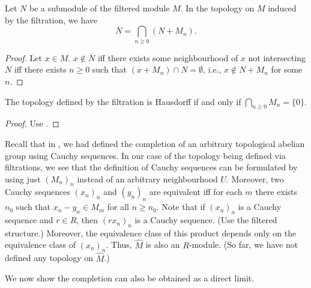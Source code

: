 \begin{prop}
	Let $N$ be a submodule of the filtered module $M$. In the topology on $M$ induced by the filtration, we have
	\begin{equation*} 
		\overline{N} = \bigcap_{n \ge 0} (N + M_{n}).
	\end{equation*}
\end{prop}
\begin{proof} 
	Let $x \in M$. $x \notin \overline{N}$ iff there exists some neighbourhood of $x$ not intersecting $N$ iff there exists $n \ge 0$ such that $(x + M_{n}) \cap N = \emptyset$, i.e., $x \notin N + M_{n}$ for some $n$.
\end{proof}

\begin{cor} \label{cor:filtration-hausdorff-intersection-zero}
	The topology defined by the filtration is Hausdorff if and only if $\bigcap_{n \ge 0} M_{n} = \{0\}$.
\end{cor}
\begin{proof} 
	Use .
\end{proof}

Recall that in , we had defined the completion of an arbitrary topological abelian group using Cauchy sequences. In our case of the topology being defined via filtrations, we see that the definition of Cauchy sequences can be formulated by using just $(M_{n})_{n}$ instead of an arbitrary neighbourhood $U$. Moreover, two Cauchy sequences $(x_{n})_{n}$ and $(y_{n})_{n}$ are equivalent iff for each $m$ there exists $n_{0}$ such that $x_{n} - y_{n} \in M_{m}$ for all $n \ge n_{0}$. \newline
Note that if $(x_{n})_{n}$ is a Cauchy sequence and $r \in R$, then $(r x_{n})_{n}$ is a Cauchy sequence. (Use the filtered structure.) \newline
Moreover, the equivalence class of this product depends only on the equivalence class of $(x_{n})_{n}$. Thus, $\widehat{M}$ is also an $R$-module. (So far, we have not defined any topology on $\widehat{M}$.)

We now show the completion can also be obtained as a direct limit.


